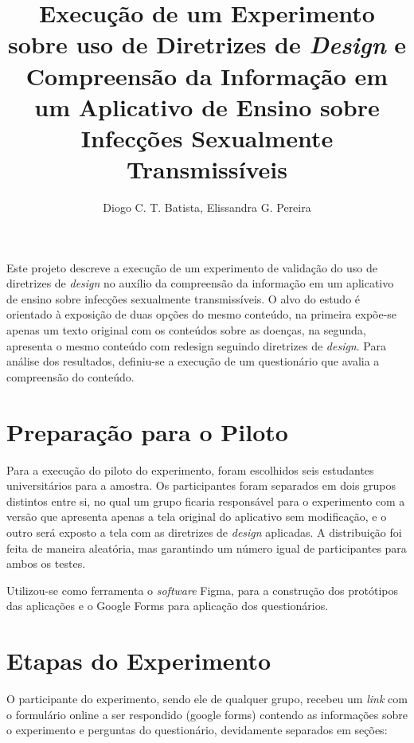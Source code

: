 \documentclass[12pt]{article}
\title{Execução de um Experimento sobre uso de Diretrizes de \textit{Design} e Compreensão da Informação em um Aplicativo de Ensino sobre Infecções Sexualmente Transmissíveis}
\author{Diogo C. T. Batista\inst{1}, Elissandra G. Pereira\inst{1}}
\begin{document}
\maketitle

\begin{resumo}
	Este projeto descreve a execução de um experimento de validação do uso de diretrizes de \textit{design} no auxílio da compreensão da informação em um aplicativo de ensino sobre infecções sexualmente transmissíveis. O alvo do estudo é orientado à exposição de duas opções do mesmo conteúdo, na primeira expõe-se apenas um texto original com os conteúdos sobre as doenças, na segunda, apresenta o mesmo conteúdo com redesign seguindo diretrizes de \textit{design}. Para análise dos resultados, definiu-se a execução de um questionário que avalia a compreensão do conteúdo.
\end{resumo}

\section{Preparação para o Piloto}

Para a execução do piloto do experimento, foram escolhidos seis estudantes universitários para a amostra. Os participantes foram separados em dois grupos distintos entre si, no qual um grupo ficaria responsável para o experimento com a versão que apresenta apenas a tela original do aplicativo sem modificação, e o outro será exposto a tela com as diretrizes de \textit{design} aplicadas. A distribuição foi feita de maneira aleatória, mas garantindo um número igual de participantes para ambos os testes.

Utilizou-se como ferramenta o \textit{software} Figma, para a construção dos protótipos das aplicações e o Google Forms para aplicação dos questionários.

\section{Etapas do Experimento}
\label{experimento}

O participante do experimento, sendo ele de qualquer grupo, recebeu um \textit{link} com o formulário online a ser respondido (google forms) contendo as informações sobre o experimento e perguntas do questionário, devidamente separados em seções:
\end{document}
